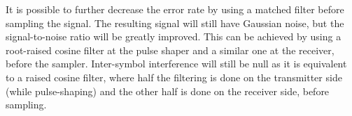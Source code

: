 \begin{refsection}

%
%
%
%
%



It is possible to further decrease the error rate by using a matched filter before sampling the signal. The resulting signal will still have Gaussian noise, but the signal-to-noise ratio will be greatly improved. This can be achieved by using a root-raised cosine filter at the pulse shaper and a similar one at the receiver, before the sampler. Inter-symbol interference will still be null as it is equivalent to a raised cosine filter, where half the filtering is done on the transmitter side (while pulse-shaping) and the other half is done on the receiver side, before sampling.


\end{refsection}

